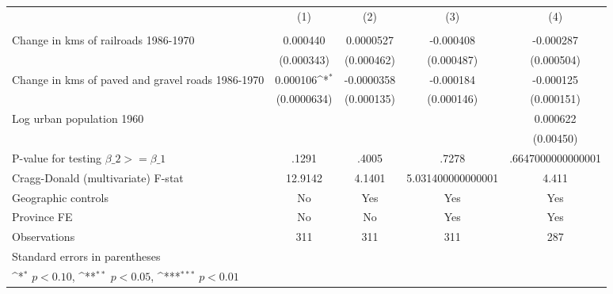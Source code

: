{
\def\sym#1{\ifmmode^{#1}\else\(^{#1}\)\fi}
\begin{tabular}{l*{4}{c}}
\hline\hline
                &\multicolumn{1}{c}{(1)}&\multicolumn{1}{c}{(2)}&\multicolumn{1}{c}{(3)}&\multicolumn{1}{c}{(4)}\\
                &\multicolumn{1}{c}{}&\multicolumn{1}{c}{}&\multicolumn{1}{c}{}&\multicolumn{1}{c}{}\\
\hline
Change in kms of railroads 1986-1970& 0.000440         &0.0000527         &-0.000408         &-0.000287         \\
                &(0.000343)         &(0.000462)         &(0.000487)         &(0.000504)         \\
[1em]
Change in kms of paved and gravel roads 1986-1970& 0.000106\sym{*}  &-0.0000358         &-0.000184         &-0.000125         \\
                &(0.0000634)         &(0.000135)         &(0.000146)         &(0.000151)         \\
[1em]
Log urban population 1960&                  &                  &                  & 0.000622         \\
                &                  &                  &                  &(0.00450)         \\
\hline
P-value for testing $\beta\_{2} >= \beta\_{1}$&    .1291         &    .4005         &    .7278         &.6647000000000001         \\
Cragg-Donald (multivariate) F-stat&  12.9142         &   4.1401         &5.031400000000001         &    4.411         \\
Geographic controls&       No         &      Yes         &      Yes         &      Yes         \\
Province FE     &       No         &       No         &      Yes         &      Yes         \\
Observations    &      311         &      311         &      311         &      287         \\
\hline\hline
\multicolumn{5}{l}{\footnotesize Standard errors in parentheses}\\
\multicolumn{5}{l}{\footnotesize \sym{*} \(p<0.10\), \sym{**} \(p<0.05\), \sym{***} \(p<0.01\)}\\
\end{tabular}
}
